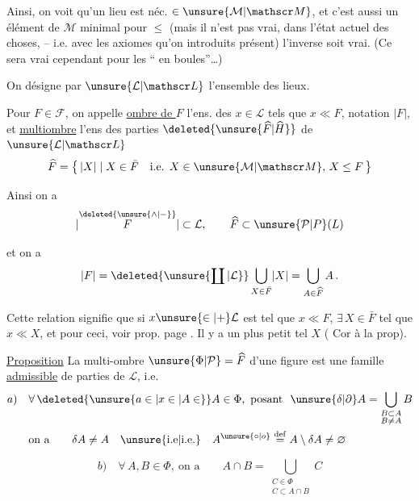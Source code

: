 Ainsi, on voit qu'un lieu est néc. $\in\unsure{\mathcal M|\mathscr M}$, et c'est aussi un élément de $\mathcal M$ minimal pour $\leq$ (mais il n'est pas vrai, dans l'état actuel des choses, -- i.e. avec les axiomes qu'on  introduits  présent) l'inverse soit vrai. (Ce sera vrai cependant pour les `` en boules''\ldots)

On désigne par $\unsure{\mathcal L|\mathscr L}$ l'ensemble des lieux.

 Pour  $F\in\mathcal F$, on appelle \uline{ombre de $F$} l'ens. des $x\in\mathcal L$ tels que $x\ll F$, notation $\lvert F\rvert$, et \uline{multiombre} l'ens
des parties $\deleted{\unsure{\widehat F|\widehat H}}$ de $\unsure{\mathcal L|\mathscr L}$
\[
\widehat F=\bigl\{\,\lvert X\rvert\mid X\in\bar F\quad\text{i.e. }X\in\unsure{\mathcal M|\mathscr M},\,X\leq F\,\bigr\}
\]

Ainsi on a
\[
\lvert\overset{\deleted{\unsure{\wedge|{-}}}}{F}\rvert\subset\mathcal L,\qquad
\widehat F\subset\unsure{\mathcal P|P}(L)
\]

et on a
\[
\lvert F\rvert=\deleted{\unsure{\coprod|\mathcal L}}\bigcup_{X\in\bar F}\lvert X\rvert=\bigcup_{A\in\widehat F}A\,.
\]

Cette relation signifie que si $x\unsure{\in|+}\mathcal L$ est tel que $x\ll F$, $\exists\,X\in\bar F$ tel que $x\ll X$, \unsure{\S|(*)} 
et pour ceci, voir prop. page . Il y a  un plus petit tel $X$ (\unsure{=|:} Cor à la prop).

\uline{Proposition} La multi-ombre $\unsure{\Phi|\mathcal P}=\widehat F$ d'une figure est une famille \uline{admissible} de parties de $\mathcal L$, i.e.
\[
\begin{aligned}
a)\quad &\forall\,\deleted{\unsure{a\in|x\in|A\in}}A\in\Phi,\ \text{posant }\ \unsure{\delta|\partial}A=\bigcup_{\substack{B\subset A\\B\neq A}}B\\
&\text{on a}\qquad \delta A\neq A\quad\text{\unsure{i.e|i.e.}}\quad A^{\unsure{\circ|o}}\overset{\mathrm{def}}{=}A\setminus\delta A\neq\varnothing
\end{aligned}
\]

\[
b)\quad \forall\,A,B\in\Phi,\ \text{on a}\qquad A\cap B=\bigcup_{\substack{C\in\Phi\\C\subset A\cap B}}C
\]
